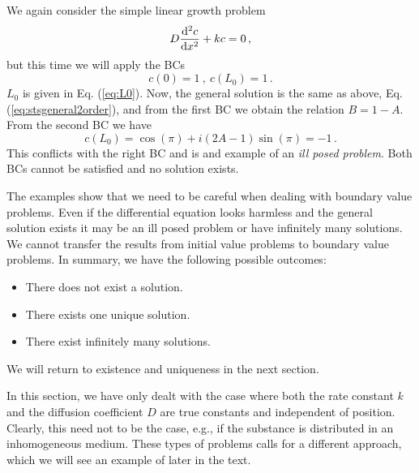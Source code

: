 \begin{example}
  We again consider the simple linear growth problem 
  \begin{equation}
    D\frac{\mathrm{d}^2c}{\mathrm{d} x^2} + kc=0 \, , 
  \end{equation}
  but this time we will apply the BCs
  \begin{equation}
    c(0) = 1 \ , \ c(L_0) = 1 \, .
  \end{equation}
  $L_0$ is given in Eq. (\ref{eq:L0}).  Now, the general solution is the same
	as above, Eq. (\ref{eq:stsgeneral2order}), 
	and from the first BC we obtain the relation $B=1-A$. From the second BC we have 
  \begin{equation}
    c(L_0)=\cos(\pi) + i(2A-1)\sin(\pi) = -1 \, .
  \end{equation}
	This conflicts with the right BC and is and example of an \emph{ill posed problem}. 
	Both BCs cannot be satisfied and no solution exists.
\end{example}

The examples show that we need to be careful when dealing with boundary
value problems. Even if the differential equation looks harmless and the general
solution exists it may be an ill posed problem or have infinitely many solutions. 
We cannot transfer the results from initial value problems to boundary value
problems. In summary, we have the following possible outcomes:
\begin{itemize}
\item There does not exist a solution.
\item There exists one unique solution. 
\item There exist infinitely many solutions.
\end{itemize}
We will return to existence and uniqueness in the next section.

In this section, we have only dealt with the case where both the
rate constant $k$ and the diffusion coefficient $D$ are true constants and
independent of position. Clearly, this need not to be the case, e.g., 
if the substance is distributed in an inhomogeneous medium. These types of
problems calls for a different approach, which we will see an example of later
in the text.  

